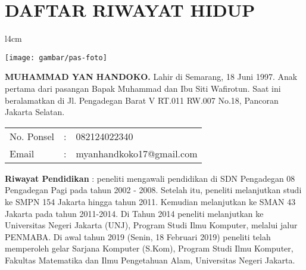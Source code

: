 \pagestyle{empty}
\chapter*{\centering \large DAFTAR RIWAYAT HIDUP}
\thispagestyle{empty}

\begin{wrapfigure}{l}{4cm}
	\vspace{-25pt}
	\begin{center}
		\texttt{[image: gambar/pas-foto]}
	\end{center}
	\vspace{-80pt}
\end{wrapfigure}

\noindent \textbf{MUHAMMAD YAN HANDOKO.}  Lahir di Semarang, 18 Juni 1997.  Anak pertama dari pasangan Bapak Muhammad dan Ibu Siti Wafirotun. Saat ini beralamatkan di Jl. Pengadegan Barat V RT.011 RW.007 No.18, Pancoran Jakarta Selatan.

\vspace{0.5cm}
\noindent
\begin{center}
	\begin{flushright}
		\begin{tabular}{lcl}
			No. Ponsel	& :&  082124022340 \\
			Email	& :&  myanhandkoko17@gmail.com
		\end{tabular}
	\end{flushright}
\end{center}
\vspace{0.5cm}

\noindent \textbf{Riwayat Pendidikan} : peneliti mengawali pendidikan di SDN Pengadegan 08 Pengadegan Pagi pada tahun 2002 - 2008. Setelah itu, peneliti melanjutkan studi ke SMPN 154 Jakarta hingga tahun 2011. Kemudian melanjutkan ke SMAN 43 Jakarta pada tahun 2011-2014. Di Tahun 2014 peneliti melanjutkan ke Universitas Negeri Jakarta (UNJ), Program Studi Ilmu Komputer, melalui jalur PENMABA. Di awal tahun 2019 (Senin, 18 Februari 2019) peneliti telah memperoleh gelar Sarjana Komputer (S.Kom), Program Studi Ilmu Komputer, Fakultas Matematika dan Ilmu Pengetahuan Alam, Universitas Negeri Jakarta.


